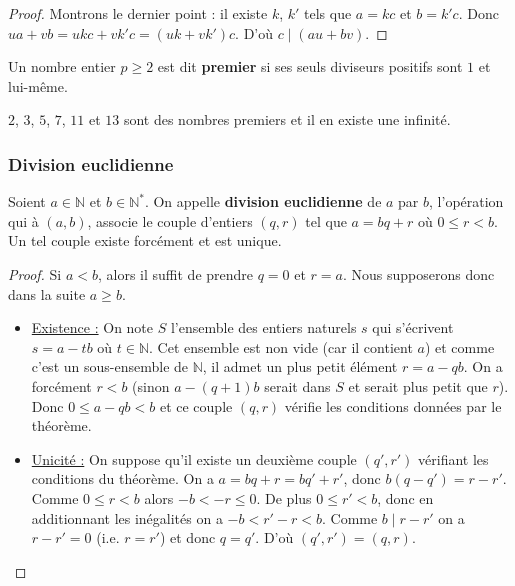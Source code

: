   \begin{proof}
    Montrons le dernier point : il existe $k$, $k'$ tels que $a = kc$ et $b = k'c$. Donc $ua + vb = ukc + vk'c = (uk + vk')c$. D'où $c \mid (au + bv)$.
  \end{proof}
  
  \begin{definition}
    Un nombre entier $p \geq 2$ est dit \textbf{premier} si ses seuls diviseurs positifs sont $1$ et lui-même.
  \end{definition}
  
  \begin{example}
    $2$, $3$, $5$, $7$, $11$ et $13$ sont des nombres premiers et il en existe une infinité.
  \end{example}
  
  \subsubsection{Division euclidienne}
  
  \begin{theorem}
    Soient $a \in \mathbb{N}$ et $b \in \mathbb{N}^*$. On appelle \textbf{division euclidienne} de $a$ par $b$, l'opération qui à $(a, b)$, associe le couple d'entiers $(q, r)$ tel que $a = bq + r$ où $0 \leq r < b$. Un tel couple existe forcément et est unique.
  \end{theorem}
  
  \begin{proof}
    Si $a < b$, alors il suffit de prendre $q = 0$ et $r = a$. Nous supposerons donc dans la suite $a \geq b$.
    \begin{itemize}
      \item \uline{Existence :} On note $S$ l'ensemble des entiers naturels $s$ qui s'écrivent $s = a - tb$ où $t \in \mathbb{N}$. Cet ensemble est non vide (car il contient $a$) et comme c'est un sous-ensemble de $\mathbb{N}$, il admet un plus petit élément $r = a - qb$. On a forcément $r < b$ (sinon $a-(q+1)b$ serait dans $S$ et serait plus petit que $r$). Donc $0 \leq a - qb < b$ et ce couple $(q, r)$ vérifie les conditions données par le théorème.
      \item \uline{Unicité :} On suppose qu'il existe un deuxième couple $(q', r')$ vérifiant les conditions du théorème. On a $a = bq + r = bq' + r'$, donc $b(q-q') = r-r'$. Comme $0 \leq r < b$ alors $-b < -r \leq 0$. De plus $0 \leq r' < b$, donc en additionnant les inégalités on a $-b < r' - r < b$. Comme $b \mid r - r'$ on a $r - r' = 0$ (i.e. $r = r'$) et donc $q = q'$. D'où $(q', r') = (q, r)$.
    \end{itemize}
  \end{proof}
  
